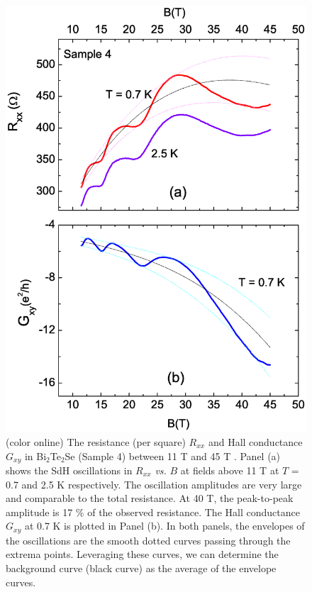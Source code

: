 \begin{figure}[!htbp]
  \begin{center}
\includegraphics[width=0.9\linewidth]{ch-bts/figures/FigRxxvsB.eps}
\caption{\label{figRvsB} (color online)
The resistance (per square) $R_{xx}$ and Hall conductance $G_{xy}$ in Bi$_2$Te$_2$Se (Sample 4) between 11 T and 45 T .
Panel (a) shows the SdH oscillations in $R_{xx}$ \emph{vs.} $B$ at fields above 11 T at $T$ = 0.7 and 2.5 K respectively.
The oscillation amplitudes are very large and comparable to the total resistance. At 40 T, the peak-to-peak amplitude is 17 $\%$ of the observed resistance.  The Hall conductance $G_{xy}$ at 0.7 K is plotted in Panel (b). In both panels, the envelopes of the oscillations are the smooth dotted curves passing through the extrema points. Leveraging these curves, we can determine the background curve (black curve) as the average of the envelope curves.  
}
  \end{center}
\end{figure}

